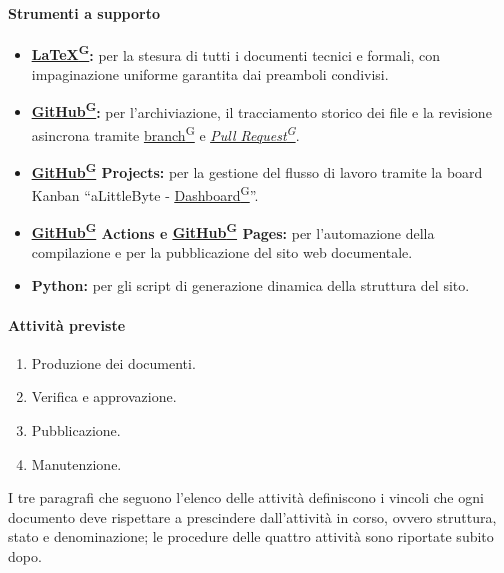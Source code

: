 \documentclass[a4paper,12pt]{article}
\providecommand{\glslink}[2]{\href{https://alittlebyte-19.github.io/Documentazione/glossario.html\#gls-#1}{\underline{#2}\textsuperscript{\scriptsize G}}}
\begin{document}
\paragraph{Strumenti a supporto}
\begin{itemize}
    \item \textbf{\glslink{latex}{LaTeX}:} per la stesura di tutti i documenti tecnici e formali, con impaginazione uniforme garantita dai preamboli condivisi.
    \item \textbf{\glslink{github}{GitHub}:} per l'archiviazione, il tracciamento storico dei file e la revisione asincrona tramite \glslink{branch}{branch} e \textit{\glslink{pull-request}{Pull Request}}.
    \item \textbf{\glslink{github}{GitHub} Projects:} per la gestione del flusso di lavoro tramite la board Kanban ``aLittleByte - \glslink{dashboard}{Dashboard}''.
    \item \textbf{\glslink{github}{GitHub} Actions e \glslink{github}{GitHub} Pages:} per l'automazione della compilazione e per la pubblicazione del sito web documentale.
    \item \textbf{Python:} per gli script di generazione dinamica della struttura del sito.
\end{itemize}

\paragraph{Attività previste}
\begin{enumerate}
    \item Produzione dei documenti.
    \item Verifica e approvazione.
    \item Pubblicazione.
    \item Manutenzione.
\end{enumerate}

I tre paragrafi che seguono l'elenco delle attività definiscono i vincoli che ogni documento deve rispettare a prescindere dall'attività in corso, ovvero struttura, stato e denominazione; le procedure delle quattro attività sono riportate subito dopo.
\end{document}
